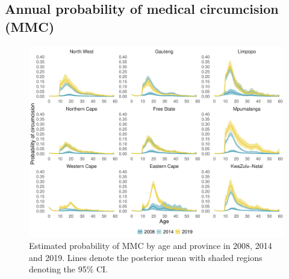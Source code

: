 \documentclass{article}
\begin{document}
\begin{appendix}

\subsection{Annual probability of medical circumcision (MMC)}


\begin{figure}[H]
	\centering
	\includegraphics[width = \linewidth]{Figures/suppmat/Rates/ProbabilityofMMC_SingleAge_Province.pdf}
	\caption{Estimated probability of MMC by age and province in 2008, 2014 and 2019. Lines denote the posterior mean with shaded regions denoting the 95\% CI.}
\end{figure}	



\end{appendix}
\end{document}
